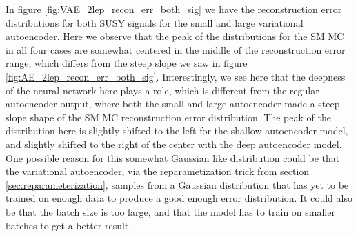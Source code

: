 In figure \ref{fig:VAE_2lep_recon_err_both_sig} we have the reconstruction error distributions for both SUSY signals for 
the small and large variational autoencoder. Here we observe that the peak of the distributions for the SM MC in all four cases 
are somewhat centered in the middle of the reconstruction error range, which differs from the steep slope we saw in figure
\ref{fig:AE_2lep_recon_err_both_sig}. Interestingly, we see here that the deepness of the neural network here plays a role, 
which is different from the regular autoencoder output, where both the small and large autoencoder made a steep slope shape of 
the SM MC reconstruction error distribution. The peak of the distribution here is slightly shifted to the left for the shallow 
autoencoder model, and slightly shifted to the right of the center with the deep autoencoder model. One possible reason for this 
somewhat Gaussian like distribution could be that the variational autoencoder, via the reparametization trick from section 
\ref{sec:reparameterization}, samples from a Gaussian distribution that has yet to be trained on enough data to produce a 
good enough error distribution. It could also be that the batch size is too large, and that the model has to train on smaller 
batches to get a better result. 

